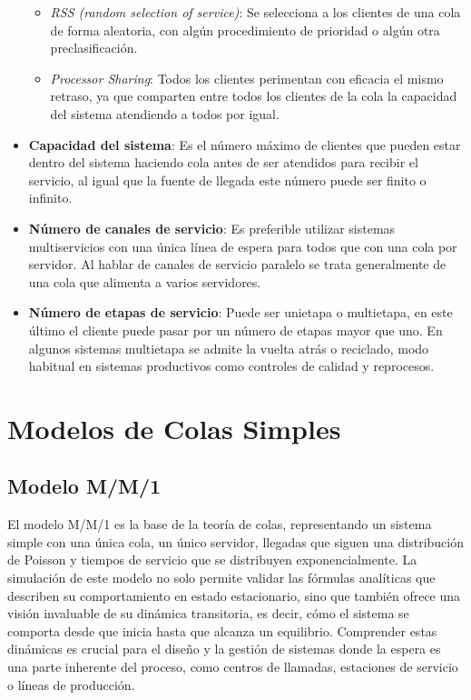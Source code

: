 \documentclass{article}
\begin{document}
\begin{itemize}
\begin{itemize}
            \item   \textit{RSS (random selection of service)}: Se selecciona a los clientes de una cola de forma aleatoria, con algún procedimiento de prioridad o algún otra preclasificación.

            \item \textit{Processor Sharing}: Todos los clientes perimentan con eficacia el mismo retraso, ya que comparten entre todos los clientes de la cola la capacidad del sistema atendiendo a todos por igual.
        \end{itemize}
    
    \item \textbf{Capacidad del sistema}: Es el número máximo de clientes que pueden estar dentro del sistema haciendo cola antes de ser atendidos para recibir el servicio, al igual que la fuente de llegada este número puede ser finito o infinito.
    
    \item \textbf{Número de canales de servicio}: Es preferible utilizar sistemas multiservicios con una única línea de espera para todos que con una cola por servidor. Al hablar de canales de servicio paralelo se trata generalmente de una cola que alimenta a varios servidores.
    
    \item \textbf{Número de etapas de servicio}: Puede ser unietapa o multietapa, en este último el cliente puede pasar por un número de etapas mayor que uno. En algunos sistemas multietapa se admite la vuelta atrás o reciclado, modo habitual en sistemas productivos como controles de calidad y reprocesos.
\end{itemize}

\section{Modelos de Colas Simples}
\subsection{Modelo M/M/1}

El modelo M/M/1 es la base de la teoría de colas, representando un sistema simple con una única cola, un único servidor, llegadas que siguen una distribución de Poisson y tiempos de servicio que se distribuyen exponencialmente. La simulación de este modelo no solo permite validar las fórmulas analíticas que describen su comportamiento en estado estacionario, sino que también ofrece una visión invaluable de su dinámica transitoria, es decir, cómo el sistema se comporta desde que inicia hasta que alcanza un equilibrio. Comprender estas dinámicas es crucial para el diseño y la gestión de sistemas donde la espera es una parte inherente del proceso, como centros de llamadas, estaciones de servicio o líneas de producción.
\end{document}
